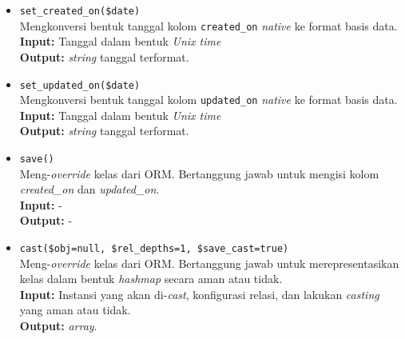 \begin{itemize}
\begin{itemize}
                \item \texttt{set\_created\_on(\$date)} \\
                    Mengkonversi bentuk tanggal kolom \texttt{created\_on} \textit{native} ke 
                    format basis data. \\
                    \textbf{Input:} Tanggal dalam bentuk \textit{Unix time}\\
                    \textbf{Output:} \textit{string} tanggal terformat.
                
                \item \texttt{set\_updated\_on(\$date)} \\
                    Mengkonversi bentuk tanggal kolom \texttt{updated\_on} \textit{native} ke 
                    format basis data. \\
                    \textbf{Input:} Tanggal dalam bentuk \textit{Unix time}\\
                    \textbf{Output:} \textit{string} tanggal terformat.
                
                \item \texttt{save()}\\
                    Meng-\textit{override} kelas dari ORM. Bertanggung jawab untuk mengisi
                    kolom \textit{created\_on} dan \textit{updated\_on}.\\
                    \textbf{Input:} -\\
                    \textbf{Output:} -
                
                \item \texttt{cast(\$obj=null, \$rel\_depths=1, \$save\_cast=true)}\\
                    Meng-\textit{override} kelas dari ORM. Bertanggung jawab untuk merepresentasikan
                    kelas dalam bentuk \textit{hashmap} secara aman atau tidak. \\
                    \textbf{Input:} Instansi yang akan di-\textit{cast}, konfigurasi relasi, dan
                        lakukan \textit{casting} yang aman atau tidak.\\
                    \textbf{Output:} \textit{array}.
            \end{itemize}
            

\end{itemize}
